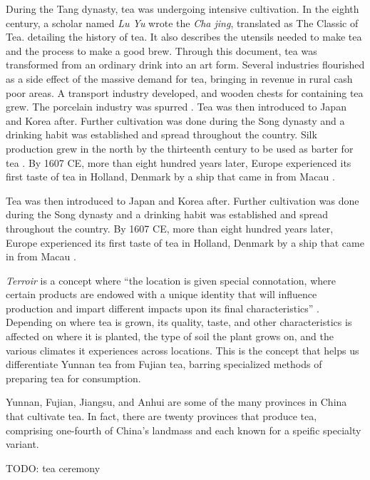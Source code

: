 During the Tang dynasty, tea was undergoing intensive cultivation. In the
eighth century, a scholar named \emph{Lu Yu} wrote the \emph{Cha jing},
translated as The Classic of Tea. detailing the history of tea. It also
describes the utensils needed to make tea and the process to make a good brew.
Through this document, tea was transformed from an ordinary drink into an art
form. Several industries flourished as a side effect of the massive demand for
tea, bringing in revenue in rural cash poor areas. A transport industry
developed, and wooden chests for containing tea grew. The porcelain industry was
spurred . Tea was then introduced to Japan and Korea after. Further cultivation
was done during the Song dynasty and a drinking habit was established and spread
throughout the country. Silk production grew in the north by the thirteenth
century to be used as barter for tea \autocite[2-10]{chow_all_1990}. By 1607 CE,
more than eight hundred years later, Europe experienced its first taste of tea
in Holland, Denmark by a ship that came in from Macau \autocite{chen_tea_2012}.

Tea was then introduced to Japan and Korea after. Further cultivation was done
during the Song dynasty and a drinking habit was established and spread
throughout the country. By 1607 CE, more than eight hundred years later, Europe
experienced its first taste of tea in Holland, Denmark by a ship that came in
from Macau \autocite{chen_tea_2012}.

\emph{Terroir} is a concept where ``the location is given special connotation,
where certain products are endowed with a unique identity that will influence
production and impart different impacts upon its final characteristics''
\autocite{silva_characterization_2014}. Depending on where tea is grown, its
quality, taste, and other characteristics is affected on where it is planted,
the type of soil the plant grows on, and the various climates it experiences
across locations. This is the concept that helps us differentiate Yunnan tea
from Fujian tea, barring specialized methods of preparing tea for consumption.

Yunnan, Fujian, Jiangsu, and Anhui are some of the many provinces in China that
cultivate tea. In fact, there are twenty provinces that produce tea, comprising
one-fourth of China's landmass \autocite{chen_tea_2012} and each known for a
speific specialty variant.


TODO: tea ceremony

